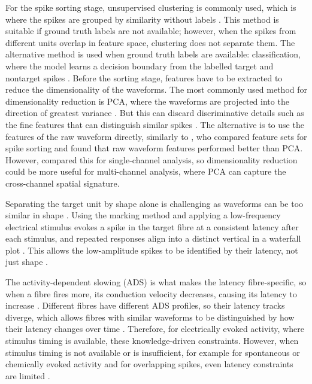 \documentclass[ %
                    author={Rzan Alkabier},
                    supervisor={Dr. Zahraa Abdallah},
                    degree={MSc},
                     title={Denoising Extracellular Recording for Spike Detection and Classification on Single Channels},
                    subtitle={Does denoising improve detection and classification performance?},
                      type={},
                      year={2026}]{dissertation}
\begin{document}
\noindent
For the spike sorting stage, unsupervised clustering is commonly used, which is where the spikes are grouped by similarity without labels \cite{lewicki_review_1998}. This method is suitable if ground truth labels are not available; however, when the spikes from different units overlap in feature space, clustering does not separate them. The alternative method is used when ground truth labels are available: classification, where the model learns a decision boundary from the labelled target and nontarget spikes \cite{troglio_hybrid_2026}. Before the sorting stage, features have to be extracted to reduce the dimensionality of the waveforms. The most commonly used method for dimensionality reduction is PCA, where the waveforms are projected into the direction of greatest variance \cite{quiroga_unsupervised_2004}. But this can discard discriminative details such as the fine features that can distinguish similar spikes \cite{quiroga_unsupervised_2004}. The alternative is to use the features of the raw waveform directly, similarly to \cite{troglio_hybrid_2026}, who compared feature sets for spike sorting and found that raw waveform features performed better than PCA. However, \cite{troglio_hybrid_2026} compared this for single-channel analysis, so dimensionality reduction could be more useful for multi-channel analysis, where PCA can capture the cross-channel spatial signature. 
\bigskip

\noindent
Separating the target unit by shape alone is challenging as waveforms can be too similar in shape \cite{troglio_hybrid_2026}. Using the marking method and applying a low-frequency electrical stimulus evokes a spike in the target fibre at a consistent latency after each stimulus, and repeated responses align into a distinct vertical in a waterfall plot \cite{schmelz_delayed_1995}. This allows the low-amplitude spikes to be identified by their latency, not just shape \cite{troglio_hybrid_2026}. 
\bigskip

\noindent
The activity-dependent slowing (ADS) is what makes the latency fibre-specific, so when a fibre fires more, its conduction velocity decreases, causing its latency to increase \cite{serra_activitydependent_1999}. Different fibres have different ADS profiles, so their latency tracks diverge, which allows fibres with similar waveforms to be distinguished by how their latency changes over time \cite{troglio_hybrid_2026}. Therefore, for electrically evoked activity, where stimulus timing is available, these knowledge-driven constraints. However, when stimulus timing is not available or is insufficient, for example for spontaneous or chemically evoked activity and for overlapping spikes,  even latency constraints are limited \cite{troglio_hybrid_2026}. 
\bigskip
\end{document}
